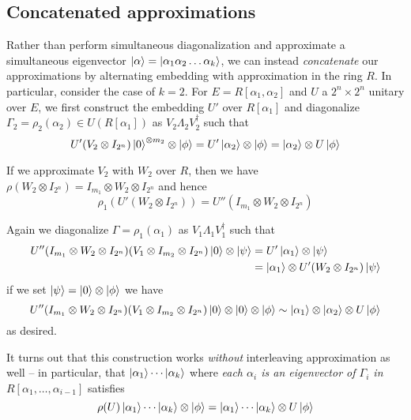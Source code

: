 \documentclass{article}
\theoremstyle{definition}
\theoremstyle{theorem}
\theoremstyle{remark}
\begin{document}
\subsection{Concatenated approximations}

Rather than perform simultaneous diagonalization and approximate a simultaneous eigenvector $\ket{\alpha}=\ket{\alpha_1\alpha_2\dots\alpha_k}$, we can instead \emph{concatenate} our approximations by alternating embedding with approximation in the ring $R$. In particular, consider the case of $k=2$. For $E=R[\alpha_1,\alpha_2]$ and $U$ a $2^n\times 2^n$ unitary over $E$, we first construct the embedding $U'$ over $R[\alpha_1]$ and diagonalize $\Gamma_2=\rho_2(\alpha_2)\in U(R[\alpha_1])$ as $V_2\Lambda_2V_2^\dagger$ such that
\[
	U'(V_2\otimes I_{2^n})\ket{0}^{\otimes m_2}\otimes\ket{\phi} = U'\ket{\alpha_2}\otimes\ket{\phi} = \ket{\alpha_2}\otimes U\ket{\phi}
\]

If we approximate $V_2$ with $W_2$ over $R$, then we have $\rho(W_2\otimes I_{2^n}) = I_{m_1}\otimes W_2\otimes I_{2^n}$ and hence
\[
	\rho_1(U'(W_2\otimes I_{2^n})) = U''(I_{m_1}\otimes W_2\otimes I_{2^n})
\]

Again we diagonalize $\Gamma=\rho_1(\alpha_1)$ as $V_1\Lambda_1 V_1^\dagger$ such that
\begin{align*}
	U''(I_{m_1}\otimes W_2\otimes I_{2^n})(V_1\otimes I_{m_2}\otimes I_{2^n})\ket{0}\otimes\ket{\psi} 
		&= U'\ket{\alpha_1}\otimes\ket{\psi}  \\
		&= \ket{\alpha_1}\otimes U'(W_2\otimes I_{2^n})\ket{\psi}
\end{align*}
if we set $\ket{\psi} = \ket{0}\otimes\ket{\phi}$ we have
\[
	U''(I_{m_1}\otimes W_2\otimes I_{2^n})(V_1\otimes I_{m_2}\otimes I_{2^n})\ket{0}\otimes\ket{0}\otimes\ket{\phi} \sim \ket{\alpha_1}\otimes\ket{\alpha_2}\otimes U\ket{\phi}
\]
as desired.

It turns out that this construction works \emph{without} interleaving approximation as well -- in particular, that $\ket{\alpha_1}\cdots\ket{\alpha_k}$ where \emph{each $\alpha_i$ is an eigenvector of $\Gamma_i$ in $R[\alpha_1,\dots,\alpha_{i-1}]$} satisfies
\[
	\rho(U)\ket{\alpha_1}\cdots\ket{\alpha_k}\otimes \ket{\phi} = \ket{\alpha_1}\cdots\ket{\alpha_k}\otimes U\ket{\phi}
\]
\end{document}
